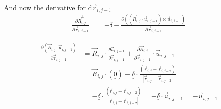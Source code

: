 \documentclass{article}
\renewcommand{\ij}{_{i,j}}
\newcommand{\ijj}{_{i,j-1}}
\newcommand{\ijjj}{_{i,j-2}}
\newcommand{\magn}[1]{\left\vert #1 \right\vert }
\renewcommand{\part}[2]{\frac{\partial #1 }{\partial #2}}
\newcommand{\ten}[1]{\underline{\underline{#1}}}
\newcommand{\rij}{\vec{r} \ij}
\newcommand{\Rij}{\vec{R} \ij}
\newcommand{\rijj}{\vec{r} \ijj}
\newcommand{\rijjj}{\vec{r} \ijjj}
\newcommand{\uijj}{\vec{u} \ijj}
\begin{document}


And now the derivative for d$\rijj$
\begin{align*}
  \part{\vec{R}\ij ^ \bot}{\vec{r}\ijj}  &= - \ten{\delta} 
  - \part{\left(\left(\vec{R}\ij \cdot \vec{u} \ijj \right) \otimes 
  \vec{u} \ijj \right)
  }{\vec{r}\ijj}
\end{align*}


\begin{align*}
  \part{\left(\vec{R}\ij \cdot \vec{u} \ijj \right)}{\vec{r}\ijj}   
  &= 
  \vec{R}\ij \cdot \part{\vec{u} \ijj}{\vec{r} \ijj} + \part{\vec{R} \ij}{\vec{r} \ijj} \cdot \vec{u}\ijj
  \\
  &= 
  \Rij \cdot \left( \ten{0}
  \right) 
  - \ten{\delta} \cdot \frac{\left( \rij - \rijjj \right)}{\magn{\rij - \rijjj}} 
  \\ 
  &= 
  - \ten{\delta} \cdot \frac{\left( \rij - \rijjj \right)}{\magn{\rij - \rijjj}} 
  =
  - \ten{\delta} \cdot \uijj
  =
  - \uijj
\end{align*}
\end{document}
